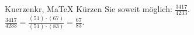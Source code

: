 \begin{MAufgabe}{Kuerzen}{kr, MaTeX}
K\"urzen Sie soweit m\"oglich: $\frac{3417}{4233}$.\\ 
\ifLsg\MLoesung
\quad $\frac{3417}{4233}=\frac{(51)\cdot(67)}{(51)\cdot(83)}=\frac{67}{83}$.\else\relax\fi
 \end{MAufgabe}